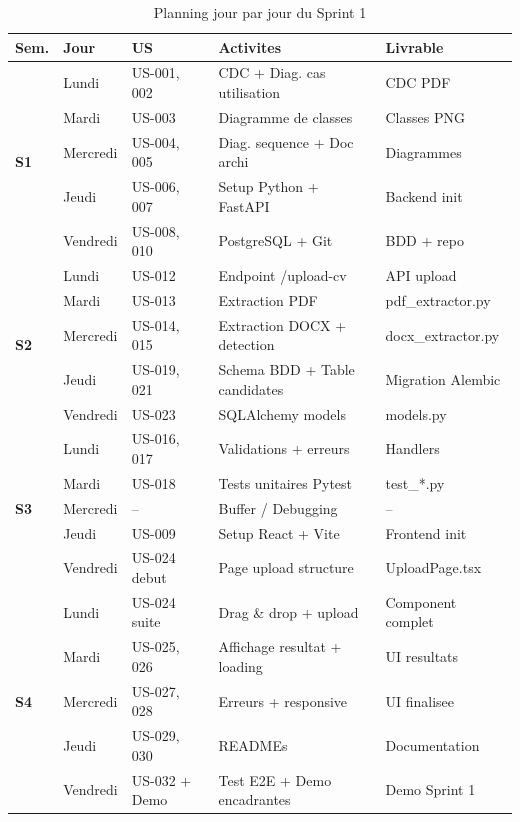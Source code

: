 ﻿\documentclass[12pt,a4paper]{report}
\begin{document}
\begin{table}[H]
\centering
\small
\begin{tabular}{|p{1.5cm}|p{2cm}|p{2cm}|p{4cm}|p{4cm}|}
\hline
\rowcolor{bleu3S!20}
\textbf{Sem.} & \textbf{Jour} & \textbf{US} & \textbf{Activites} & \textbf{Livrable} \\
\hline
\multirow{5}{*}{\textbf{S1}} & Lundi & US-001, 002 & CDC + Diag. cas utilisation & CDC PDF \\
\cline{2-5}
 & Mardi & US-003 & Diagramme de classes & Classes PNG \\
\cline{2-5}
 & Mercredi & US-004, 005 & Diag. sequence + Doc archi & Diagrammes \\
\cline{2-5}
 & Jeudi & US-006, 007 & Setup Python + FastAPI & Backend init \\
\cline{2-5}
 & Vendredi & US-008, 010 & PostgreSQL + Git & BDD + repo \\
\hline
\multirow{5}{*}{\textbf{S2}} & Lundi & US-012 & Endpoint /upload-cv & API upload \\
\cline{2-5}
 & Mardi & US-013 & Extraction PDF & pdf\_extractor.py \\
\cline{2-5}
 & Mercredi & US-014, 015 & Extraction DOCX + detection & docx\_extractor.py \\
\cline{2-5}
 & Jeudi & US-019, 021 & Schema BDD + Table candidates & Migration Alembic \\
\cline{2-5}
 & Vendredi & US-023 & SQLAlchemy models & models.py \\
\hline
\multirow{5}{*}{\textbf{S3}} & Lundi & US-016, 017 & Validations + erreurs & Handlers \\
\cline{2-5}
 & Mardi & US-018 & Tests unitaires Pytest & test\_*.py \\
\cline{2-5}
 & Mercredi & -- & Buffer / Debugging & -- \\
\cline{2-5}
 & Jeudi & US-009 & Setup React + Vite & Frontend init \\
\cline{2-5}
 & Vendredi & US-024 debut & Page upload structure & UploadPage.tsx \\
\hline
\multirow{5}{*}{\textbf{S4}} & Lundi & US-024 suite & Drag \& drop + upload & Component complet \\
\cline{2-5}
 & Mardi & US-025, 026 & Affichage resultat + loading & UI resultats \\
\cline{2-5}
 & Mercredi & US-027, 028 & Erreurs + responsive & UI finalisee \\
\cline{2-5}
 & Jeudi & US-029, 030 & READMEs & Documentation \\
\cline{2-5}
 & Vendredi & US-032 + Demo & Test E2E + Demo encadrantes & Demo Sprint 1 \\
\hline
\end{tabular}
\caption{Planning jour par jour du Sprint 1}
\end{table}
\end{document}
